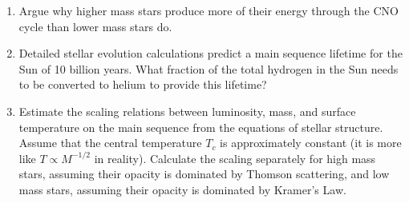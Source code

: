 \begin{enumerate} 
\item Argue why higher mass stars produce more of their energy through
    the CNO cycle than lower mass stars do.
\item Detailed stellar evolution calculations predict a main sequence
    lifetime for the Sun of 10 billion years. What fraction of the
    total hydrogen in the Sun needs to be converted to helium to
    provide this lifetime?
\item Estimate the scaling relations between luminosity, mass, and
    surface temperature on the main sequence from the equations of
    stellar structure. Assume that the central temperature $T_c$ is
    approximately constant (it is more like $T\propto M^{-1/2}$ in
    reality). Calculate the scaling separately for high mass stars,
    assuming their opacity is dominated by Thomson scattering, and low
    mass stars, assuming their opacity is dominated by Kramer's Law.


\end{enumerate}
